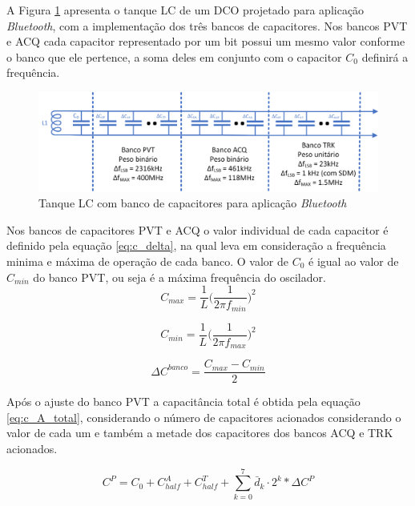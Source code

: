 A Figura \ref{fig:lc_bank_capacitor} apresenta o tanque LC de um DCO projetado para aplicação \textit{Bluetooth}, com a implementação dos três bancos de capacitores. Nos bancos PVT e ACQ cada capacitor representado por um bit possui um mesmo valor conforme o banco que ele pertence, a soma deles em conjunto com o capacitor $C_0$ definirá a frequência. 

\begin{figure}[h!]
	\caption{Tanque LC com banco de capacitores para aplicação \textit{Bluetooth} }
	\begin{center}
		\includegraphics[scale=0.8]{img/lc_bank_capacitor.png}
	\end{center}
	\label{fig:lc_bank_capacitor}
\end{figure}


Nos bancos de capacitores PVT e ACQ o valor individual de cada capacitor é definido pela equação \ref{eq:c_delta}, na qual leva em consideração a frequência minima e máxima de operação de cada banco. O valor de $C_0$ é igual ao valor de $C_{min}$ do banco PVT, ou seja é a máxima frequência do oscilador.
\begin{equation}
	C_{max} = \frac{1}{L} \big( \frac{1}{2 \pi f_{min}} \big)^2
	\label{eq:cmax}
\end{equation}

\begin{equation}
	C_{min} = \frac{1}{L} \big( \frac{1}{2 \pi f_{max}} \big)^2
	\label{eq:cmin}
\end{equation}

\begin{equation}
	\Delta C^{banco} = \frac{	C_{max} - C_{min}}{2}
	\label{eq:c_delta}
\end{equation}

Após o ajuste do banco PVT a capacitância total é obtida pela equação \ref{eq:c_A_total}, considerando o número de capacitores acionados considerando o valor de cada um e também a metade dos capacitores dos bancos ACQ e TRK acionados.

\begin{equation}
	C^P = C_0 + C^A_{half} + C^T_{half} + \sum_{k=0}^{7} \bar{d}_k \cdot 2^k * 	\Delta C^P
	\label{eq:c_P_total}
\end{equation}

